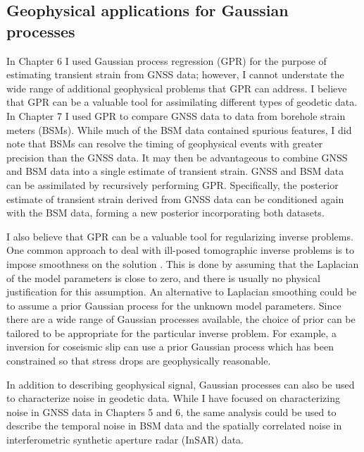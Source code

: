 \subsection{Geophysical applications for Gaussian processes}
In Chapter 6 I used Gaussian process regression (GPR) for the purpose of estimating transient strain from GNSS data; however, I cannot understate the wide range of additional geophysical problems that GPR can address. I believe that GPR can be a valuable tool for assimilating different types of geodetic data. In Chapter 7 I used GPR to compare GNSS data to data from borehole strain meters (BSMs). While much of the BSM data contained spurious features, I did note that BSMs can resolve the timing of geophysical events with greater precision than the GNSS data. It may then be advantageous to combine GNSS and BSM data into a single estimate of transient strain. GNSS and BSM data can be assimilated by recursively performing GPR. Specifically, the posterior estimate of transient strain derived from GNSS data can be conditioned again with the BSM data, forming a new posterior incorporating both datasets. 

I also believe that GPR can be a valuable tool for regularizing inverse problems. One common approach to deal with ill-posed tomographic inverse problems is to impose smoothness on the solution \citep{Aster2011}. This is done by assuming that the Laplacian of the model parameters is close to zero, and there is usually no physical justification for this assumption. An alternative to Laplacian smoothing could be to assume a prior Gaussian process for the unknown model parameters. Since there are a wide range of Gaussian processes available, the choice of prior can be tailored to be appropriate for the particular inverse problem. For example, a inversion for coseismic slip can use a prior Gaussian process which has been constrained so that stress drops are geophysically reasonable.             

In addition to describing geophysical signal, Gaussian processes can also be used to characterize noise in geodetic data. While I have focused on characterizing noise in GNSS data in Chapters 5 and 6, the same analysis could be used to describe the temporal noise in BSM data and the spatially correlated noise in interferometric synthetic aperture radar (InSAR) data.         